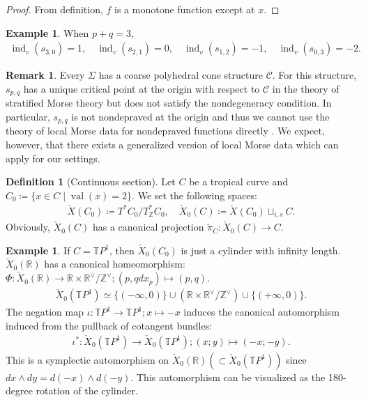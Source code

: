 \documentclass[a4paper,dvipdfmx,reqno,12pt]{amsart}
\theoremstyle{definition}
\newtheorem{definition}[theorem]{Definition}
\newtheorem{example}[theorem]{Example}
\newtheorem{remark}[theorem]{Remark}
\newcommand{\deq}{\coloneqq}
\newcommand{\Z}{\mathbb{Z}}%
\newcommand{\opn}[1]{\operatorname{#1}}
\numberwithin{equation}{section}
\begin{document}
\begin{proof}
From definition, $f$ is a monotone function except 
at $x$.
\end{proof}

\begin{example}
When $p+q=3$, 
\begin{align}
\opn{ind}_v(s_{3,0})=1, \quad \opn{ind}_v(s_{2,1})=0, \quad \opn{ind}_v(s_{1,2})=-1, \quad \opn{ind}_v(s_{0,3})=-2.
\end{align}
\end{example}

\begin{remark}
\label{remark-nondeprave-curve}
Every $\Sigma$ has a coarse polyhedral cone structure 
$\mathscr{C}$. 
For this structure, $s_{p,q}$ has a unique critical 
point at the origin with respect to 
$\mathscr{C}$ in the theory of stratified 
Morse theory \cite[Part I.2.1]{MR932724}
but does not satisfy the nondegeneracy condition.
In particular, $s_{p,q}$ is not nondepraved 
at the origin \cite[Part I.2.3.]{MR932724} 
and thus we cannot use the theory of local Morse 
data for nondepraved functions directly 
\cite[Part I.3.5.2 Definition]{MR932724}. 
We expect, however, that there exists a 
generalized version of local Morse data 
which can apply for our settings.
\end{remark}

\begin{definition}[{Continuous section}]
\label{definition-continuous-section}
Let $C$ be a tropical curve and 
$C_{0}\deq \{x\in C\mid \opn{val}(x)=2\}$.
We set the following spaces:
\begin{align}
\check{X}(C_0)\deq T^{*}C_0/T^{*}_{\Z}C_0, \quad 
\check{X}_0(C)\deq \check{X}(C_0)\sqcup_{i,s}C.
\end{align}
Obviously, $\check{X}_0(C)$ has a canonical projection
$\check{\pi}_C \colon \check{X}_0(C)\to C$.
\end{definition}

\begin{example}
If $C=\mathbb{T}P^{1}$, then 
$\check{X}_0(C_0)$ is just a 
cylinder with infinity length.
$\check{X}_0(\mathbb{R})$ has a canonical homeomorphism:
$\Phi \colon \check{X}_0(\mathbb{R})\to 
\mathbb{R}\times \mathbb{R}^{\vee}/\mathbb{Z}^{\vee};
(p,q dx_p)\mapsto (p,q)$.
\begin{align}
\check{X}_0(\mathbb{T}P^{1})\simeq 
\{(-\infty,0)\}\cup(\mathbb{R}\times \mathbb{R}^{\vee}/\mathbb{Z}^{\vee})
\cup \{(+\infty,0)\}.
\end{align}
The negation map
$\iota \colon\mathbb{T}P^{1}\to \mathbb{T}P^{1}; x\mapsto -x$
induces the canonical automorphism induced from the pullback of cotangent bundles:
\begin{align}
\iota^{*}\colon \check{X}_0(\mathbb{T}P^{1})
\to \check{X}_0(\mathbb{T}P^{1}); (x;y)\mapsto (-x;-y). 
\end{align}
This is a symplectic automorphism on 
$\check{X}_0(\mathbb{R}) (\subset \check{X}_0(\mathbb{T}P^{1}))$ since 
$dx\wedge dy=d(-x)\wedge d(-y)$.
This automorphism can be visualized as the 180-degree rotation of the 
cylinder.
\end{example}
\end{document}
